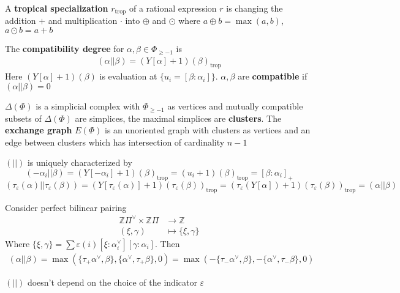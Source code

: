\documentclass[main]{subfiles}
\begin{document}
\begin{definition}
A \textbf{tropical specialization} $r_\mathrm{trop}$ of a rational expression $r$ is changing the addition $+$ and multiplication $\cdot$ into $\oplus$ and $\odot$ where $a\oplus b=\max(a,b)$, $a\odot b=a+b$ \par
The \textbf{compatibility degree} for $\alpha,\beta\in\Phi_{\geq-1}$ is
\begin{align*}
(\alpha||\beta)=(Y[\alpha]+1)(\beta)_\mathrm{trop}
\end{align*}
Here $(Y[\alpha]+1)(\beta)$ is evaluation at $\{u_i=[\beta:\alpha_i]\}$. $\alpha,\beta$ are \textbf{compatible} if $(\alpha||\beta)=0$ \par
$\Delta(\Phi)$ is a simplicial complex with $\Phi_{\geq-1}$ as vertices and mutually compatible subsets of $\Delta(\Phi)$ are simplices, the maximal simplices are \textbf{clusters}. The \textbf{exchange graph} $E(\Phi)$ is an unoriented graph with clusters as vertices and an edge between clusters which has intersection of cardinality $n-1$
\end{definition}

\begin{remark}
$(||)$ is uniquely characterized by
\[(-\alpha_i||\beta)=(Y[-\alpha_i]+1)(\beta)_{\mathrm{trop}}=(u_i+1)(\beta)_{\mathrm{trop}}=[\beta:\alpha_i]_+\]
\[(\tau_\varepsilon(\alpha)||\tau_\varepsilon(\beta))=(Y[\tau_\varepsilon(\alpha)]+1)(\tau_\varepsilon(\beta))_\mathrm{trop}=(\tau_\varepsilon(Y[\alpha])+1)(\tau_\varepsilon(\beta))_\mathrm{trop}=(\alpha||\beta)\]
\end{remark}

\begin{proposition}
Consider perfect bilinear pairing
\begin{align*}
\mathbb Z\Pi^\vee\times \mathbb Z\Pi&\to\mathbb Z \\
(\xi,\gamma)&\mapsto\{\xi,\gamma\}
\end{align*}
Where $\{\xi,\gamma\}=\sum\varepsilon(i)[\xi:\alpha_i^\vee][\gamma:\alpha_i]$. Then
\begin{align*}
(\alpha||\beta)=\max(\{\tau_+\alpha^\vee,\beta\},\{\alpha^\vee,\tau_+\beta\},0)=\max(-\{\tau_-\alpha^\vee,\beta\},-\{\alpha^\vee,\tau_-\beta\},0)
\end{align*}
\end{proposition}

\begin{note}
$(||)$ doesn't depend on the choice of the indicator $\varepsilon$
\end{note}
\end{document}

